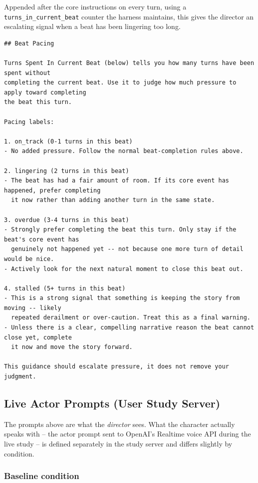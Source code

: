 \documentclass[10pt]{article}
\begin{document}
Appended after the core instructions on every turn, using a
\texttt{turns\_in\_current\_beat} counter the harness maintains, this gives
the director an escalating signal when a beat has been lingering too long.

\begin{lstlisting}
## Beat Pacing

Turns Spent In Current Beat (below) tells you how many turns have been spent without
completing the current beat. Use it to judge how much pressure to apply toward completing
the beat this turn.

Pacing labels:

1. on_track (0-1 turns in this beat)
- No added pressure. Follow the normal beat-completion rules above.

2. lingering (2 turns in this beat)
- The beat has had a fair amount of room. If its core event has happened, prefer completing
  it now rather than adding another turn in the same state.

3. overdue (3-4 turns in this beat)
- Strongly prefer completing the beat this turn. Only stay if the beat's core event has
  genuinely not happened yet -- not because one more turn of detail would be nice.
- Actively look for the next natural moment to close this beat out.

4. stalled (5+ turns in this beat)
- This is a strong signal that something is keeping the story from moving -- likely
  repeated derailment or over-caution. Treat this as a final warning.
- Unless there is a clear, compelling narrative reason the beat cannot close yet, complete
  it now and move the story forward.

This guidance should escalate pressure, it does not remove your judgment.
\end{lstlisting}

\subsection{Live Actor Prompts (User Study Server)}
\label{app:live-actor-prompts}

The prompts above are what the \emph{director} sees. What the character
actually speaks with -- the actor prompt sent to OpenAI's Realtime voice API
during the live study -- is defined separately in the study server and
differs slightly by condition.

\subsubsection{Baseline condition}
\end{document}
